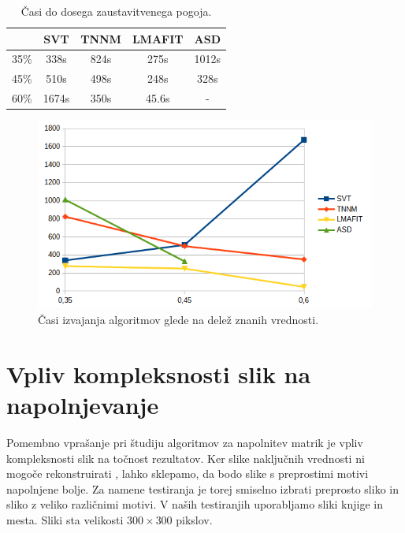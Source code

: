 \begin{table}[h]
    \centering
    \begin{tabular}{|c|c|c|c|c|}
        \hline
             & SVT   & TNNM & LMAFIT & ASD   \\ \hline
        35\% & 338s  & 824s & 275s   & 1012s \\ \hline
        45\% & 510s  & 498s & 248s   & 328s  \\ \hline
        60\% & 1674s & 350s & 45.6s  & -     \\ \hline
    \end{tabular}
    \caption{Časi do dosega zaustavitvenega pogoja.}
\end{table}
\begin{figure}[!ht]
    \centering
    \includegraphics[width=\linewidth]{Poglavja/Slike/grayscale1000/grafCas.png}
    \caption{Časi izvajanja algoritmov glede na delež znanih vrednosti.}
\end{figure}


\section{Vpliv kompleksnosti slik na napolnjevanje} \label{1307-2251}
Pomembno vprašanje pri študiju algoritmov za napolnitev matrik je vpliv kompleksnosti slik na točnost rezultatov. Ker slike naključnih vrednosti ni mogoče rekonstruirati , lahko sklepamo, da bodo slike s preprostimi motivi napolnjene bolje. Za namene testiranja je torej smiselno izbrati preprosto sliko in sliko z veliko različnimi motivi. V naših testiranjih uporabljamo sliki knjige in mesta. Sliki sta velikosti $300 \times 300$ pikslov.



